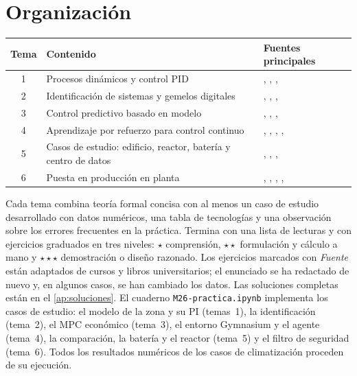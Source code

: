 \documentclass[11pt,a4paper,twoside,openany]{book}
\begin{document}
\section*{Organización}
\begin{center}\small
\begin{tabularx}{\textwidth}{@{}c>{\raggedright\arraybackslash}X>{\raggedright\arraybackslash}p{4.1cm}@{}}
\toprule
Tema & Contenido & Fuentes principales \\
\midrule
1 & Procesos dinámicos y control PID & \cite{am}, \cite{seborg}, \cite{mit10450}, \cite{skogestad} \\
2 & Identificación de sistemas y gemelos digitales & \cite{ljung}, \cite{mit6435}, \cite{narendra}, \cite{kritzinger} \\
3 & Control predictivo basado en modelo & \cite{rmd}, \cite{ee363}, \cite{nw}, \cite{lazic} \\
4 & Aprendizaje por refuerzo para control continuo & \cite{sb}, \cite{cs285}, \cite{td3}, \cite{sac}, \cite{ng} \\
5 & Casos de estudio: edificio, reactor, batería y centro de datos & \cite{drgona}, \cite{mit10450}, \cite{evansgao}, \cite{gamblegao} \\
6 & Puesta en producción en planta & \cite{am}, \cite{nist}, \cite{iec62443}, \cite{isa182}, \cite{cs329s} \\
\bottomrule
\end{tabularx}
\end{center}

Cada tema combina teoría formal concisa con al menos un caso de estudio desarrollado con datos numéricos, una tabla de tecnologías y una observación sobre los errores frecuentes en la práctica. Termina con una lista de lecturas y con ejercicios graduados en tres niveles: $\star$ comprensión, $\star\star$ formulación y cálculo a mano y $\star\star\star$ demostración o diseño razonado. Los ejercicios marcados con \emph{Fuente} están adaptados de cursos y libros universitarios; el enunciado se ha redactado de nuevo y, en algunos casos, se han cambiado los datos. Las soluciones completas están en el \cref{ap:soluciones}. El cuaderno \texttt{M26-practica.ipynb} implementa los casos de estudio: el modelo de la zona y su PI (temas~1), la identificación (tema~2), el MPC económico (tema~3), el entorno Gymnasium y el agente (tema~4), la comparación, la batería y el reactor (tema~5) y el filtro de seguridad (tema~6). Todos los resultados numéricos de los casos de climatización proceden de su ejecución.
\end{document}
